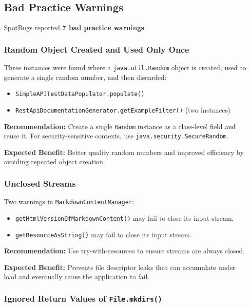 \documentclass[11pt,a4paper]{article}
\begin{document}
\subsection{Bad Practice Warnings}

SpotBugs reported \textbf{7 bad practice warnings}.

\subsubsection{Random Object Created and Used Only Once}

Three instances were found where a \texttt{java.util.Random} object is created, used to generate a single random number, and then discarded:
\begin{itemize}
    \item \texttt{SimpleAPITestDataPopulator.populate()}
    \item \texttt{RestApiDocumentationGenerator.getExampleFilter()} (two instances)
\end{itemize}

\noindent\textbf{Recommendation:} Create a single \texttt{Random} instance as a class-level field and reuse it. For security-sensitive contexts, use \texttt{java.security.SecureRandom}.

\noindent\textbf{Expected Benefit:} Better quality random numbers and improved efficiency by avoiding repeated object creation.

\subsubsection{Unclosed Streams}

Two warnings in \texttt{MarkdownContentManager}:
\begin{itemize}
    \item \texttt{getHtmlVersionOfMarkdownContent()} may fail to close its input stream.
    \item \texttt{getResourceAsString()} may fail to close its input stream.
\end{itemize}

\noindent\textbf{Recommendation:} Use try-with-resources to ensure streams are always closed.

\noindent\textbf{Expected Benefit:} Prevents file descriptor leaks that can accumulate under load and eventually cause the application to fail.

\subsubsection{Ignored Return Values of \texttt{File.mkdirs()}}
\end{document}
